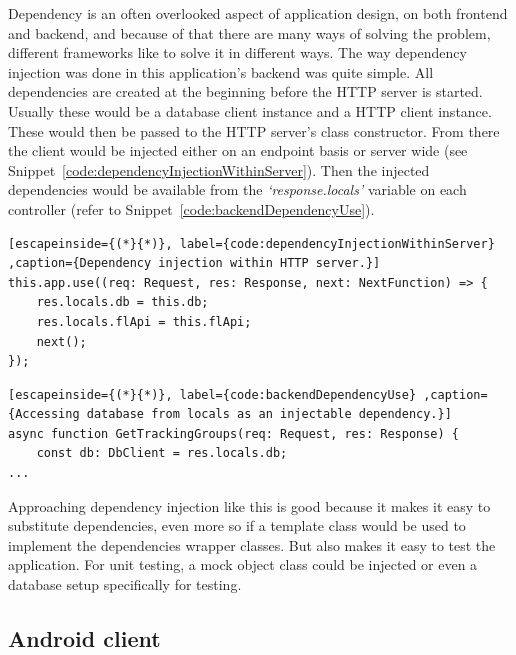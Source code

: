 \documentclass{article}
\newcommand{\vspaceconst}{-2ex}
\begin{document}
\begin{multicols}{2}
Dependency is an often overlooked aspect of application design, on both frontend and backend, and because of that there are many ways of solving the problem, different frameworks like to solve it in different ways. The way dependency injection was done in this application's backend was quite simple. All dependencies are created at the beginning before the HTTP server is started. Usually these would be a database client instance and a HTTP client instance. These would then be passed to the HTTP server's class constructor. From there the client would be injected either on an endpoint basis or server wide (see Snippet~\ref{code:dependencyInjectionWithinServer}). Then the injected dependencies would be available from the \textit{`response.locals'} variable on each controller (refer to Snippet~\ref{code:backendDependencyUse}).

\begin{lstlisting}[escapeinside={(*}{*)}, label={code:dependencyInjectionWithinServer} ,caption={Dependency injection within HTTP server.}]
this.app.use((req: Request, res: Response, next: NextFunction) => {
    res.locals.db = this.db;
    res.locals.flApi = this.flApi;
    next();
});
\end{lstlisting}

\begin{lstlisting}[escapeinside={(*}{*)}, label={code:backendDependencyUse} ,caption={Accessing database from locals as an injectable dependency.}]
async function GetTrackingGroups(req: Request, res: Response) {
    const db: DbClient = res.locals.db;
...
\end{lstlisting}

Approaching dependency injection like this is good because it makes it easy to substitute dependencies, even more so if a template class would be used to implement the dependencies wrapper classes. But also makes it easy to test the application. For unit testing, a mock object class could be injected or even a database setup specifically for testing.\\

\subsection{Android client}
\vspace{\vspaceconst}


\end{multicols}
\end{document}
